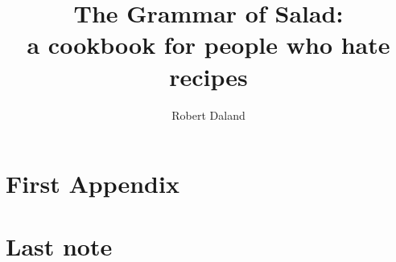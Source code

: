 \documentclass{book}
\title{The Grammar of Salad: \\
       a cookbook for people who hate recipes}
\author{Robert Daland}
\begin{document}
\frontmatter
    \maketitle \newpage
    
    
    \tableofcontents

\mainmatter
    

    \appendix
    \chapter{First Appendix}

\backmatter
    \chapter{Last note}
\end{document}
